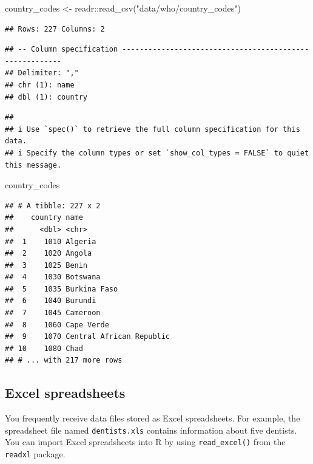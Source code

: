 \documentclass[
]{book}
\newenvironment{Shaded}{\begin{snugshade}}{\end{snugshade}}
\newcommand{\FunctionTok}[1]{\textcolor[rgb]{0.00,0.00,0.00}{#1}}
\newcommand{\NormalTok}[1]{#1}
\newcommand{\OtherTok}[1]{\textcolor[rgb]{0.56,0.35,0.01}{#1}}
\newcommand{\SpecialCharTok}[1]{\textcolor[rgb]{0.00,0.00,0.00}{#1}}
\newcommand{\StringTok}[1]{\textcolor[rgb]{0.31,0.60,0.02}{#1}}
\begin{document}
\begin{Shaded}
\begin{Highlighting}[]
\NormalTok{country\_codes }\OtherTok{\textless{}{-}}\NormalTok{ readr}\SpecialCharTok{::}\FunctionTok{read\_csv}\NormalTok{(}\StringTok{"data/who/country\_codes"}\NormalTok{)}
\end{Highlighting}
\end{Shaded}

\begin{verbatim}
## Rows: 227 Columns: 2
\end{verbatim}

\begin{verbatim}
## -- Column specification --------------------------------------------------------
## Delimiter: ","
## chr (1): name
## dbl (1): country
\end{verbatim}

\begin{verbatim}
## 
## i Use `spec()` to retrieve the full column specification for this data.
## i Specify the column types or set `show_col_types = FALSE` to quiet this message.
\end{verbatim}

\begin{Shaded}
\begin{Highlighting}[]
\NormalTok{country\_codes}
\end{Highlighting}
\end{Shaded}

\begin{verbatim}
## # A tibble: 227 x 2
##    country name                    
##      <dbl> <chr>                   
##  1    1010 Algeria                 
##  2    1020 Angola                  
##  3    1025 Benin                   
##  4    1030 Botswana                
##  5    1035 Burkina Faso            
##  6    1040 Burundi                 
##  7    1045 Cameroon                
##  8    1060 Cape Verde              
##  9    1070 Central African Republic
## 10    1080 Chad                    
## # ... with 217 more rows
\end{verbatim}

\hypertarget{excel-spreadsheets}{%
\subsection{Excel spreadsheets}\label{excel-spreadsheets}}

You frequently receive data files stored as Excel spreadsheets. For example, the spreadsheet file named \texttt{dentists.xls} contains information about five dentists. You can import Excel spreadsheets into R by using \texttt{read\_excel()} from the \texttt{readxl} package.
\end{document}
